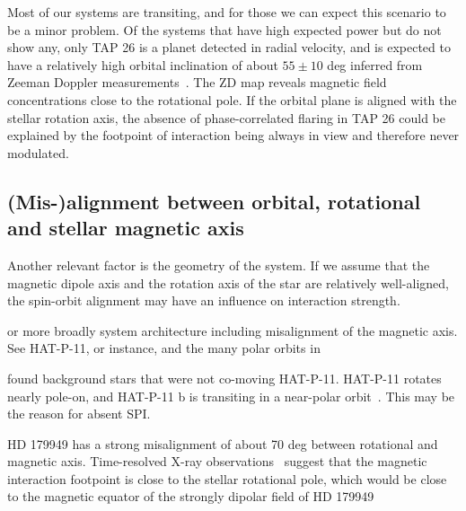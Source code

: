 \documentclass[twocolumn]{aastex631}
\begin{document}
Most of our systems are transiting, and for those we can expect this scenario to be a minor problem. Of the systems that have high expected power but do not show any, only TAP 26 is a planet detected in radial velocity, and is expected to have a relatively high orbital inclination of about $55\pm10$ deg inferred from Zeeman Doppler measurements~\citep{yu2017hot}. The ZD map reveals magnetic field concentrations close to the rotational pole. If the orbital plane is aligned with the stellar rotation axis, the absence of phase-correlated flaring in TAP 26 could be explained by the footpoint of interaction being always in view and therefore never modulated.

\subsection{(Mis-)alignment between orbital, rotational and stellar magnetic axis}
\label{sec:discussion:misalignment}
Another relevant factor is the geometry of the system. If we assume that the magnetic dipole axis and the rotation axis of the star are relatively well-aligned, the spin-orbit alignment may have an influence on interaction strength. 


or more broadly system architecture including misalignment of the magnetic axis. See HAT-P-11, or instance, and the many polar orbits in \cite{bourrier2023dream}

\cite{miskovetz2022resolving}  found background stars that were not co-moving HAT-P-11. HAT-P-11 rotates nearly pole-on, and HAT-P-11 b is transiting in a near-polar orbit~\citep{bourrier2023dream}. This may be the reason for absent SPI.

HD 179949 has a strong misalignment of about 70 deg between rotational and magnetic axis. Time-resolved X-ray observations~\citep{acharya2022xray} suggest that the magnetic interaction footpoint is close to the stellar rotational pole, which would be close to the magnetic equator of the strongly dipolar field of HD 179949
\end{document}
